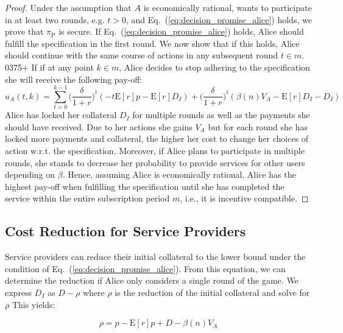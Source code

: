 \documentclass[runningheads]{llncs}
\begin{document}
\begin{proof}
Under the assumption that $A$ is economically rational, wants to participate in at least two rounds, e.g. $t>0$, and Eq.~(\ref{eq:decision_promise_alice}) holds, we prove that $\pi_{\mathrm{P}}$ is secure.
If Eq.~(\ref{eq:decision_promise_alice}) holds, Alice should fulfill the specification in the first round.
We now show that if this holds, Alice should continue with the same course of actions in any subsequent round $t \in m$.
0375+
If if at any point $k \in m$, Alice decides to stop adhering to the specification she will receive the following pay-off:
\begin{equation}
    u_A(t,k) = \sum^{k-1}_{t=0} \big(\frac{\delta}{1+r} \big)^{t} (- t\mathrm{E}[r]p -\mathrm{E}[r]D_{I})+\big(\frac{\delta}{1+r} \big)^{t} (\beta(n) V_A - \mathrm{E}[r]D_{I}-D_{I})
\end{equation}
Alice has locked her collateral $D_I$ for multiple rounds as well as the payments she should have received.
Due to her actions she gains $V_A$ but for each round she has locked more payments and collateral, the higher her cost to change her choices of action w.r.t. the specification.
Moreover, if Alice plans to participate in multiple rounds, she stands to decrease her probability to provide services for other users depending on $\beta$.
Hence, assuming Alice is economically rational, Alice has the highest pay-off when fulfilling the specification until she has completed the service within the entire subscription period $m$, i.e., it is incentive compatible.
\end{proof}

\subsection{Cost Reduction for Service Providers}
Service providers can reduce their initial collateral to the lower bound under the condition of Eq.~(\ref{eq:decision_promise_alice}).
From this equation, we can determine the reduction if Alice only considers a single round of the game.
We express $D_I$ as $D - \rho$ where $\rho$ is the reduction of the initial collateral and solve for $\rho$
This yields:

\begin{equation}
    \label{eq:single_round_reduction}
    \rho = p - \mathrm{E}[r]p + D - \beta(n) V_A
\end{equation}
\end{document}
